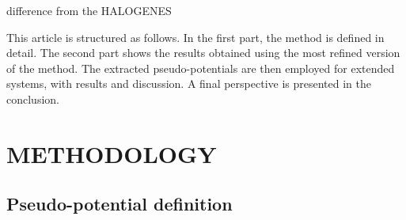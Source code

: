 \documentclass[12pt]{article}
\begin{document}

difference from the HALOGENES

This article is structured as follows.
In the first part, the method is defined in detail.
The second part shows the results obtained using the most refined version of the method. The extracted pseudo-potentials are then employed for extended systems, with results and discussion. A final perspective is presented in the conclusion.

\section*{\sffamily \Large METHODOLOGY}

\subsection*{\sffamily \large Pseudo-potential definition}
\end{document}

